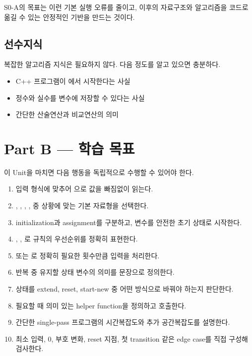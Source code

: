 S0-A의 목표는 이런 기본 실행 오류를 줄이고, 이후의 자료구조와 알고리즘을 코드로 옮길 수 있는 안정적인 기반을 만드는 것이다.

\subsection{선수지식}
복잡한 알고리즘 지식은 필요하지 않다. 다음 정도를 알고 있으면 충분하다.
\begin{itemize}
  \item C++ 프로그램이 에서 시작한다는 사실
  \item 정수와 실수를 변수에 저장할 수 있다는 사실
  \item 간단한 산술연산과 비교연산의 의미
\end{itemize}

\section{Part B --- 학습 목표}
이 Unit을 마치면 다음 행동을 독립적으로 수행할 수 있어야 한다.

\begin{enumerate}
  \item 입력 형식에 맞추어 으로 값을 빠짐없이 읽는다.
  \item {}, , , ,  중 상황에 맞는 기본 자료형을 선택한다.
  \item initialization과 assignment를 구분하고, 변수를 안전한 초기 상태로 시작한다.
  \item {}, , 로 규칙의 우선순위를 정확히 표현한다.
  \item {} 또는 로 정확히 필요한 횟수만큼 입력을 처리한다.
  \item 반복 중 유지할 상태 변수의 의미를 문장으로 정의한다.
  \item 상태를 extend, reset, start-new 중 어떤 방식으로 바꿔야 하는지 판단한다.
  \item 필요할 때 의미 있는 helper function을 정의하고 호출한다.
  \item 간단한 single-pass 프로그램의 시간복잡도와 추가 공간복잡도를 설명한다.
  \item 최소 입력, 0, 부호 변화, reset 지점, 첫 transition 같은 edge case를 직접 구성해 검사한다.
\end{enumerate}

